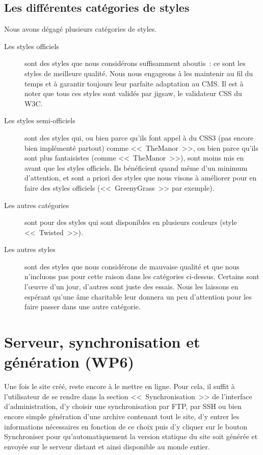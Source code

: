 \documentclass[final,11pt,a4paper,twoside,titlepage]{article}
\begin{document}
{    \subsection{Les différentes catégories de styles}
      Nous avons dégagé plusieurs catégories de styles.
      \begin{description}
        \item[Les styles officiels] sont des styles que nous considérons
          suffisamment aboutis~: ce sont les styles de meilleure qualité. Nous
          nous engageons à les maintenir au fil du temps et à garantir toujours
          leur parfaite adaptation au CMS. Il est à noter que tous ces styles
          sont validés par jigsaw, le validateur CSS du W3C.
        \item[Les styles semi-officiels] sont des styles qui, ou bien parce
          qu'ils font appel à du CSS3 (pas encore bien implémenté partout)
          comme <<~TheManor~>>, ou bien parce qu'ils sont plus fantaisistes
          (comme <<~TheManor~>>), sont moins mis en avant que les styles
          officiels. Ils bénéficient quand même d'un minimum d'attention, et
          sont a priori des styles que nous visons à améliorer pour en faire
          des styles officiels (<<~GreenyGrass~>> par exemple).
        \item[Les autres catégories] sont pour des styles qui sont disponibles
          en plusieurs couleurs (style <<~Twisted~>>).
        \item[Les autres styles] sont des styles que nous considérons de
          mauvaise qualité et que nous n'incluons pas pour cette raison dans
          les catégories ci-dessus. Certains sont l'\oe{}uvre d'un jour,
          d'autres sont juste des essais. Nous les laissons en espérant qu'une
          âme charitable leur donnera un peu d'attention pour les faire passer
          dans une autre catégorie.
      \end{description}
  \section{Serveur, synchronisation et génération (WP6)}
    Une fois le site créé, reste encore à le mettre en ligne. Pour cela, il suffit
    à l'utilisateur de se rendre dans la section <<~Synchronisation~>> de l'interface
    d'administration, d'y choisir une synchronisation par FTP, par SSH ou bien encore
    simple génération d'une archive contenant tout le site, d'y entrer les informations
    nécessaires en fonction de ce choix puis d'y cliquer sur le bouton Synchroniser
    pour qu'automatiquement la version statique du site soit générée et envoyée sur le
    serveur distant et ainsi disponible au monde entier.

}
\end{document}
